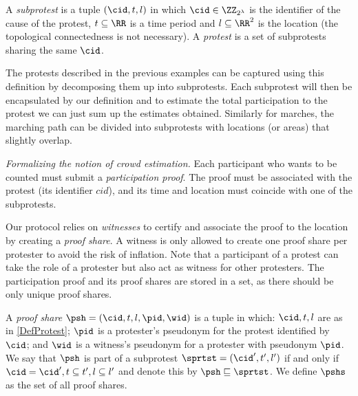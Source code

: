 
\begin{definition}\label{DefProtest}
  A \emph{subprotest} is a tuple \((\cid, t, l)\) in which \(\cid\in \ZZ_{2^\lambda}\) is the identifier of the cause of the protest,
  \(t \subseteq \RR\) is a time period and \(l \subseteq \RR^2\) is the location (the topological connectedness is not necessary).
  A \emph{protest} is a set of subprotests sharing the same \(\cid\).
\end{definition}

The protests described in the previous examples can be captured using this definition by decomposing them up into subprotests.
Each subprotest will then be encapsulated by our definition and to estimate the total participation to the protest we can just sum up the estimates obtained.
Similarly for marches, the marching path can be divided into subprotests with locations (or areas) that slightly overlap.

\emph{Formalizing the notion of crowd estimation.} 
Each participant who wants to be counted must submit a \emph{participation proof}.
The proof must be associated with the protest (\ie its identifier \(cid\)), and its time and location must coincide with one of the subprotests.

Our protocol relies on \emph{witnesses} to certify and associate the proof to the location by creating a \emph{proof share}.
A witness is only allowed to create one proof share per protester to avoid the risk of inflation.
Note that a participant of a protest can take the role of a protester but also act as witness for other protesters.
The participation proof and its proof shares are stored in a set, as there should be only unique proof shares.


\begin{definition}%
  \label{DefProofShare}\label{DefProofShares}
  A \emph{proof share} \(\psh = (\cid, t, l, \pid, \wid)\) is a tuple in which: 
  \(\cid, t, l\) are as in \cref{DefProtest};
  \(\pid\) is a protester's pseudonym for the protest identified by \(\cid\); and \(\wid\) is a witness's pseudonym for a protester with pseudonym \(\pid\).
  We say that \(\psh\) is part of a subprotest \(\sprtst = (\cid', t', l')\) if and only if \(\cid = \cid', t\subseteq t', l\subseteq l'\) and denote this by 
  \(\psh \sqsubseteq \sprtst\).
  We define \(\pshs\) as the set of all proof shares.
\end{definition}

